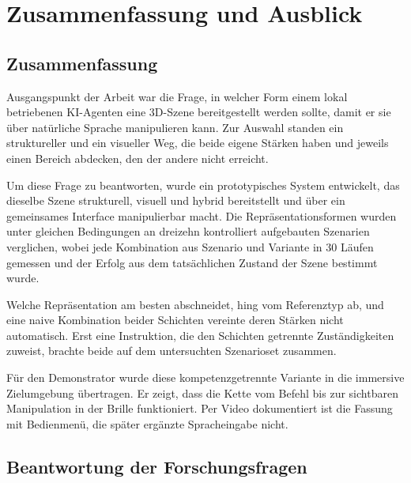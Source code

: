 
\chapter{Zusammenfassung und Ausblick}
\label{ch:zusammenfassung}

\section{Zusammenfassung}
\label{sec:zus-zusammenfassung}

Ausgangspunkt der Arbeit war die Frage, in welcher Form einem lokal betriebenen KI-Agenten eine 3D-Szene bereitgestellt werden sollte, damit er sie über natürliche Sprache manipulieren kann.
Zur Auswahl standen ein struktureller und ein visueller Weg, die beide eigene Stärken haben und jeweils einen Bereich abdecken, den der andere nicht erreicht.

Um diese Frage zu beantworten, wurde ein prototypisches System entwickelt, das dieselbe Szene strukturell, visuell und hybrid bereitstellt und über ein gemeinsames Interface manipulierbar macht.
Die Repräsentationsformen wurden unter gleichen Bedingungen an dreizehn kontrolliert aufgebauten Szenarien verglichen, wobei jede Kombination aus Szenario und Variante in 30 Läufen gemessen und der Erfolg aus dem tatsächlichen Zustand der Szene bestimmt wurde.

Welche Repräsentation am besten abschneidet, hing vom Referenztyp ab, und eine naive Kombination beider Schichten vereinte deren Stärken nicht automatisch.
Erst eine Instruktion, die den Schichten getrennte Zuständigkeiten zuweist, brachte beide auf dem untersuchten Szenarioset zusammen.

Für den Demonstrator wurde diese kompetenzgetrennte Variante in die immersive Zielumgebung übertragen.
Er zeigt, dass die Kette vom Befehl bis zur sichtbaren Manipulation in der Brille funktioniert.
Per Video dokumentiert ist die Fassung mit Bedienmenü, die später ergänzte Spracheingabe nicht.


\section{Beantwortung der Forschungsfragen}
\label{sec:zus-rq}

